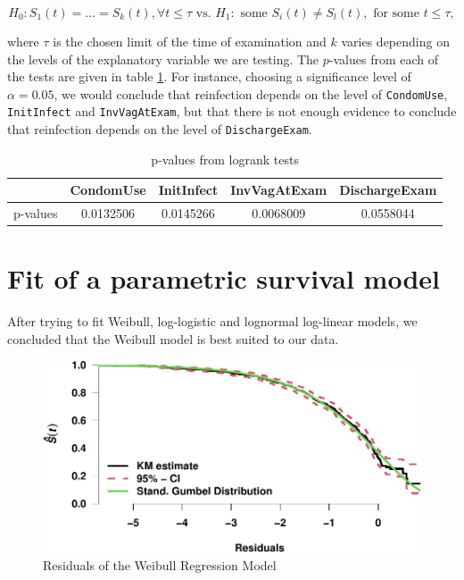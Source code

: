 \documentclass[
]{article}
\begin{document}
\begin{equation*}
        H_0: S_1(t) = \ldots = S_k(t), \forall t \leq \tau \text{ vs. } H_1: \text{ some } S_i(t) \neq S_l(t), \text{ for some } t \leq \tau,
\end{equation*}

where \(\tau\) is the chosen limit of the time of examination and \(k\) varies depending on the levels of the explanatory variable we are testing. The \(p\)-values from each of the tests are given in table \ref{tab:pvalues}. For instance, choosing a significance level of \(\alpha = 0.05\), we would conclude that reinfection depends on the level of \texttt{CondomUse}, \texttt{InitInfect} and \texttt{InvVagAtExam}, but that there is not enough evidence to conclude that reinfection depends on the level of \texttt{DischargeExam}.

\begin{table}

\caption{\label{tab:pvalues}p-values from logrank tests}
\centering
\begin{tabular}[t]{l|c|c|c|c}
\hline
  & CondomUse & InitInfect & InvVagAtExam & DischargeExam\\
\hline
p-values & 0.0132506 & 0.0145266 & 0.0068009 & 0.0558044\\
\hline
\end{tabular}
\end{table}

\hypertarget{fit-of-a-parametric-survival-model}{%
\section{Fit of a parametric survival model}\label{fit-of-a-parametric-survival-model}}

After trying to fit Weibull, log-logistic and lognormal log-linear models, we concluded that the Weibull model is best suited to our data.

\begin{figure}

{\centering \includegraphics{practical_files/figure-latex/weibull-resids-1} 

}

\caption{Residuals of the Weibull Regression Model}\label{fig:weibull-resids}
\end{figure}
\end{document}
